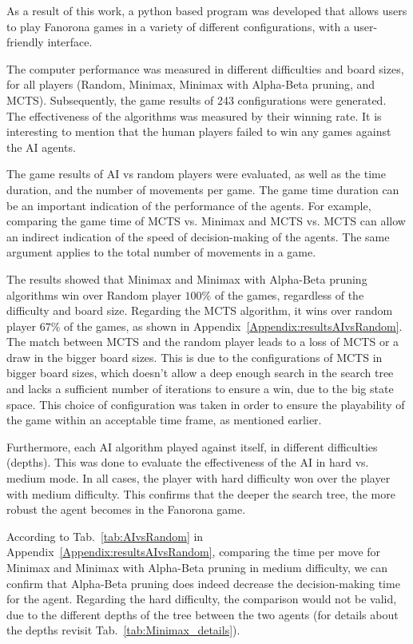 \documentclass[journal]{IEEEtran}
\begin{document}
As a result of this work, a python based program was developed that allows users to play Fanorona games in a variety of different configurations, with a user-friendly interface.

The computer performance was measured in different difficulties and board sizes, for all players (Random, Minimax, Minimax with Alpha-Beta pruning, and MCTS). Subsequently, the game results of 243 configurations were generated. The effectiveness of the algorithms was measured by their winning rate. It is interesting to mention that the human players failed to win any games against the AI agents. 

The game results of AI vs random players were evaluated, as well as the time duration, and the number of movements per game. The game time duration can be an important indication of the performance of the agents. For example, comparing the game time of MCTS vs. Minimax and MCTS vs. MCTS can allow an indirect indication of the speed of decision-making of the agents. The same argument applies to the total number of movements in a game.

The results showed that Minimax and Minimax with Alpha-Beta pruning algorithms win over Random player $100\%$ of the games, regardless of the difficulty and board size. Regarding the MCTS algorithm, it wins over random player $67\%$ of the games, as shown in Appendix~\ref{Appendix:resultsAIvsRandom}. The match between MCTS and the random player leads to a loss of MCTS or a draw in the bigger board sizes. This is due to the configurations of MCTS in bigger board sizes, which doesn't allow a deep enough search in the search tree and lacks a sufficient number of iterations to ensure a win, due to the big state space. This choice of configuration was taken in order to ensure the playability of the game within an acceptable time frame, as mentioned earlier.

Furthermore, each AI algorithm played against itself, in different difficulties (depths). This was done to evaluate the effectiveness of the AI in hard vs. medium mode. In all cases, the player with hard difficulty won over the player with medium difficulty. This confirms that the deeper the search tree, the more robust the agent becomes in the Fanorona game. 

According to Tab.~\ref{tab:AIvsRandom} in Appendix~\ref{Appendix:resultsAIvsRandom}, comparing the time per move for Minimax and Minimax with Alpha-Beta pruning in medium difficulty, we can confirm that Alpha-Beta pruning does indeed decrease the decision-making time for the agent. Regarding the hard difficulty, the comparison would not be valid, due to the different depths of the tree between the two agents (for details about the depths revisit Tab.~\ref{tab:Minimax_details}). 
\end{document}
